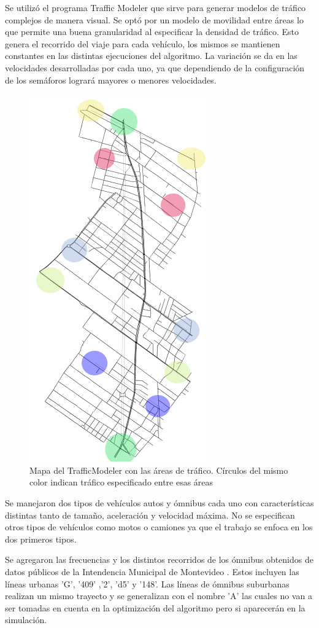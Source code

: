 Se utilizó el programa Traffic Modeler \citep{TrafficModeler} que sirve para generar modelos de tráfico complejos de manera visual. Se optó por un modelo de movilidad entre áreas lo que permite una buena granularidad al especificar la densidad de tráfico. Esto genera el recorrido del viaje para cada vehículo, los mismos se mantienen constantes en las distintas ejecuciones del algoritmo. La variación se da en las velocidades desarrolladas por cada uno, ya que dependiendo de la configuración de los semáforos logrará mayores o menores velocidades.



\begin{figure}[h]
	\centering
	\includegraphics[width=0.4\linewidth]{Figures/areaflow1}
	\caption{Mapa del TrafficModeler con las áreas de tráfico. Círculos del mismo color indican tráfico especificado entre esas áreas}
	\label{fig:areaflow1}
\end{figure}


Se manejaron dos tipos de vehículos autos y ómnibus cada uno con características distintas tanto de tamaño, aceleración y velocidad máxima. No se especifican otros tipos de vehículos como motos o camiones ya que el trabajo se enfoca en los dos primeros tipos.

Se agregaron las frecuencias y los distintos recorridos de los ómnibus obtenidos de datos públicos de la Intendencia Municipal de Montevideo \citep{IMM}. Estos incluyen las líneas urbanas  'G', '409' ,'2', 'd5'  y  '148'. Las líneas de ómnibus suburbanas realizan  un mismo  trayecto y se generalizan con el nombre 'A' las cuales no van a ser tomadas en cuenta en la optimización del algoritmo pero si aparecerán en la simulación.

